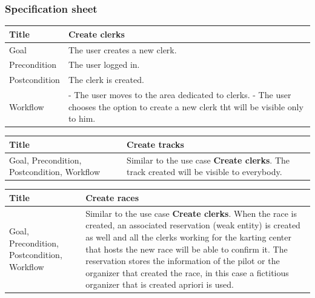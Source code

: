 \documentclass{beamer}
\begin{document}
\begin{frame}
    \frametitle{Specification sheet}
    \begin{table}
        \tiny
        \begin{tabular}{|p{2cm}|p{6cm}|}
        \hline  
        Title & \textbf{Create clerks} \\
        \hline
        Goal & The user creates a new clerk. \\
        \hline
        Precondition & The user logged in. \\
        \hline
        Postcondition & The clerk is created. \\
        \hline
        Workflow &
        - The user moves to the area dedicated to clerks. \newline
        - The user chooses the option to create a new clerk tht will be visible only to him. \\
        \hline
        \end{tabular}
\end{table}

\begin{table}
    \tiny
    \begin{tabular}{|p{2cm}|p{6cm}|}
    \hline  
    Title & \textbf{Create tracks} \\
    \hline
    Goal, Precondition, Postcondition, Workflow & Similar to the use case \textbf{Create clerks}.
    The track created will be visible to everybody. \\
    \hline
    \end{tabular}
\end{table}

\begin{table}
    \tiny
    \begin{tabular}{|p{2cm}|p{6cm}|}
    \hline  
    Title & \textbf{Create races} \\
    \hline
    Goal, Precondition, Postcondition, Workflow & Similar to the use case \textbf{Create clerks}. 
    When the race is created, an associated reservation (weak entity) is created as well and all the clerks
    working for the karting center that hosts the new race will be able to confirm it.
    The reservation stores the information of the pilot or the organizer that created the race, 
    in this case a fictitious organizer that is created apriori is used.\\
    \hline
    \end{tabular}
\end{table}

\end{frame}
\end{document}
